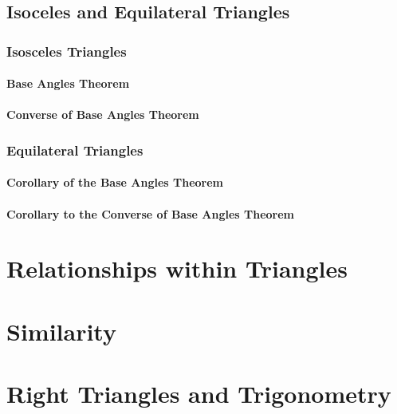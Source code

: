 \documentclass[]{book}
\begin{document}
\section{Isoceles and Equilateral
Triangles}\label{isoceles-and-equilateral-triangles}

\subsection{Isosceles Triangles}\label{isosceles-triangles}

\subsubsection{Base Angles Theorem}\label{base-angles-theorem}

\subsubsection{Converse of Base Angles
Theorem}\label{converse-of-base-angles-theorem}

\subsection{Equilateral Triangles}\label{equilateral-triangles}

\subsubsection{Corollary of the Base Angles
Theorem}\label{corollary-of-the-base-angles-theorem}

\subsubsection{Corollary to the Converse of Base Angles
Theorem}\label{corollary-to-the-converse-of-base-angles-theorem}

\chapter{Relationships within
Triangles}\label{relationships-within-triangles}

\chapter{Similarity}\label{similarity}

\chapter{Right Triangles and
Trigonometry}\label{right-triangles-and-trigonometry}
\end{document}

